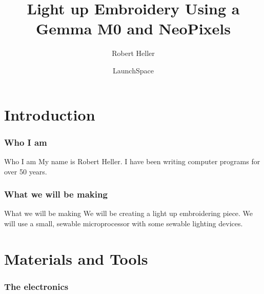 \documentclass[aspectratio=169]{beamer}
\title{Light up Embroidery Using a Gemma M0 and NeoPixels}
\author{Robert Heller}
\date{LaunchSpace}
\begin{document}
\frame{\titlepage}

\part{Introduction}

\section{Who I am}
\begin{frame}[fragile]{Who I am}
My name is Robert Heller.  I have been writing computer programs for over 50
years.
\end{frame}
\section{What we will be making}
\begin{frame}[fragile]{What we will be making}
We will be creating a light up embroidering piece.  We will use a small, 
sewable microprocessor with some sewable lighting devices.
\end{frame}
\part{Materials and Tools}

\section{The electronics}
\frame{\tableofcontents[hideothersubsections,sectionstyle=show/hide]}
\end{document}
